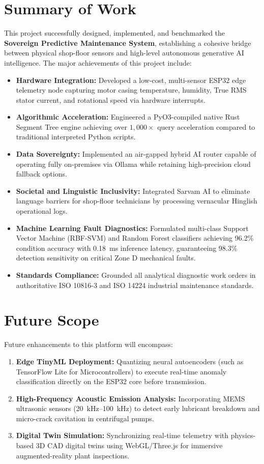 \documentclass[12pt,a4paper,oneside]{report}
\begin{document}
\section{Summary of Work}
This project successfully designed, implemented, and benchmarked the \textbf{Sovereign Predictive Maintenance System}, establishing a cohesive bridge between physical shop-floor sensors and high-level autonomous generative AI intelligence. The major achievements of this project include:
\begin{itemize}[leftmargin=*,noitemsep]
    \item \textbf{Hardware Integration:} Developed a low-cost, multi-sensor ESP32 edge telemetry node capturing motor casing temperature, humidity, True RMS stator current, and rotational speed via hardware interrupts.
    \item \textbf{Algorithmic Acceleration:} Engineered a PyO3-compiled native Rust Segment Tree engine achieving over $1,000\times$ query acceleration compared to traditional interpreted Python scripts.
    \item \textbf{Data Sovereignty:} Implemented an air-gapped hybrid AI router capable of operating fully on-premises via Ollama while retaining high-precision cloud fallback options.
    \item \textbf{Societal and Linguistic Inclusivity:} Integrated Sarvam AI to eliminate language barriers for shop-floor technicians by processing vernacular Hinglish operational logs.
    \item \textbf{Machine Learning Fault Diagnostics:} Formulated multi-class Support Vector Machine (RBF-SVM) and Random Forest classifiers achieving 96.2\% condition accuracy with 0.18~ms inference latency, guaranteeing 98.3\% detection sensitivity on critical Zone D mechanical faults.
    \item \textbf{Standards Compliance:} Grounded all analytical diagnostic work orders in authoritative ISO 10816-3 and ISO 14224 industrial maintenance standards.
\end{itemize}

\section{Future Scope}
Future enhancements to this platform will encompass:
\begin{enumerate}[label=\textbf{\arabic*.}]
    \item \textbf{Edge TinyML Deployment:} Quantizing neural autoencoders (such as TensorFlow Lite for Microcontrollers) to execute real-time anomaly classification directly on the ESP32 core before transmission.
    \item \textbf{High-Frequency Acoustic Emission Analysis:} Incorporating MEMS ultrasonic sensors (20~kHz--100~kHz) to detect early lubricant breakdown and micro-crack cavitation in centrifugal pumps.
    \item \textbf{Digital Twin Simulation:} Synchronizing real-time telemetry with physics-based 3D CAD digital twins using WebGL/Three.js for immersive augmented-reality plant inspections.
\end{enumerate}
\end{document}
